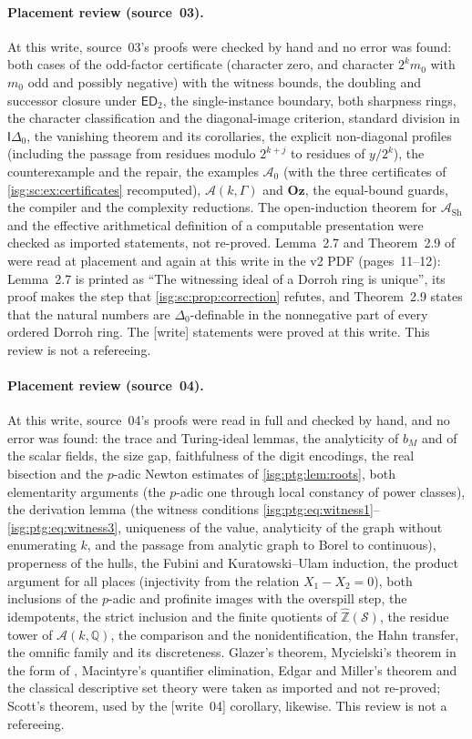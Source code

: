 \documentclass[11pt]{article}
\theoremstyle{definition}
\theoremstyle{remark}
\newcommand{\Oz}{\ensuremath{\mathbf{Oz}}}
\newcommand{\Z}{\mathbb{Z}}
\newcommand{\Q}{\mathbb{Q}}
\newcommand{\Zhat}{\widehat{\Z}}
\newcommand{\ED}{\mathsf{ED}}
\newcommand{\Idelta}{\mathsf{I}\Delta_0}
\newcommand{\Asc}{\mathcal{A}}
\begin{document}
\paragraph{Placement review (source~03).} At this write, source~03's
proofs were checked by hand and no error was found: both cases
of the odd-factor certificate (character zero, and character $2^km_0$ with
$m_0$ odd and possibly negative) with the witness bounds, the doubling and
successor closure under $\ED_2$, the single-instance boundary, both
sharpness rings, the character classification and the diagonal-image
criterion, standard division in $\Idelta$, the vanishing theorem and its
corollaries, the explicit non-diagonal profiles (including the passage from
residues modulo $2^{k+j}$ to residues of $y/2^k$), the counterexample and
the repair, the examples $\Asc_0$ (with the three certificates of
\cref{isg:sc:ex:certificates} recomputed), $\Asc(k,\Gamma)$ and $\Oz$, the
equal-bound guards, the compiler and the complexity reductions. The
open-induction theorem for $\Asc_{\mathrm{Sh}}$ and the effective
arithmetical definition of a computable presentation were checked as
imported statements, not re-proved. Lemma~2.7 and Theorem~2.9 of
\cite{ELV} were read at placement and again at this write in the v2 PDF
(pages~11--12): Lemma~2.7 is printed as ``The witnessing ideal of a
Dorroh ring is unique'', its proof makes the step that
\cref{isg:sc:prop:correction} refutes, and Theorem~2.9 states that the
natural numbers are $\Delta_0$-definable in the nonnegative part of every
ordered Dorroh ring. The \textup{[write]} statements were proved at this
write. This review is not a refereeing.

\paragraph{Placement review (source~04).} At this write, source~04's proofs
were read in full and checked by hand, and no error was found: the trace and
Turing-ideal lemmas, the analyticity of $b_M$ and of the scalar fields, the
size gap, faithfulness of the digit encodings, the real bisection and the
$p$-adic Newton estimates of \cref{isg:ptg:lem:roots}, both elementarity
arguments (the $p$-adic one through local constancy of power classes), the
derivation lemma (the witness conditions
\eqref{isg:ptg:eq:witness1}--\eqref{isg:ptg:eq:witness3}, uniqueness of the
value, analyticity of the graph without enumerating $k$, and the passage
from analytic graph to Borel to continuous), properness of the hulls, the
Fubini and Kuratowski--Ulam induction, the product argument for all places
(injectivity from the relation $X_1-X_2=0$), both inclusions of the
$p$-adic and profinite images with the overspill step, the idempotents, the
strict inclusion and the finite quotients of $\Zhat(\mathcal S)$, the
residue tower of $\Asc(k,\Q)$, the comparison and the nonidentification,
the Hahn transfer, the omnific family and its discreteness. Glazer's
theorem, Mycielski's theorem in the form of \cite[Theorem~1]{DolezalKubis},
Macintyre's quantifier elimination, Edgar and Miller's theorem and the
classical descriptive set theory were taken as imported and not re-proved;
Scott's theorem, used by the \textup{[write~04]} corollary, likewise. This
review is not a refereeing.
\end{document}
